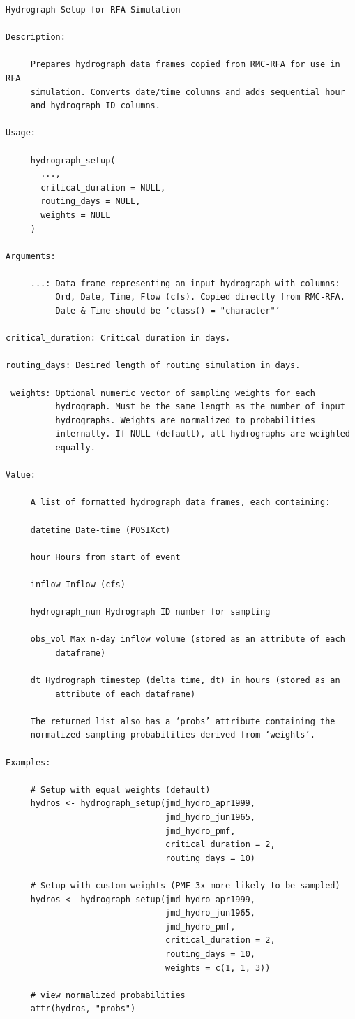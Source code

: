 \documentclass[
  letterpaper,
  DIV=11,
  numbers=noendperiod]{scrreprt}
\begin{document}
\begin{verbatim}
Hydrograph Setup for RFA Simulation

Description:

     Prepares hydrograph data frames copied from RMC-RFA for use in RFA
     simulation. Converts date/time columns and adds sequential hour
     and hydrograph ID columns.

Usage:

     hydrograph_setup(
       ...,
       critical_duration = NULL,
       routing_days = NULL,
       weights = NULL
     )
     
Arguments:

     ...: Data frame representing an input hydrograph with columns:
          Ord, Date, Time, Flow (cfs). Copied directly from RMC-RFA.
          Date & Time should be ‘class() = "character"’

critical_duration: Critical duration in days.

routing_days: Desired length of routing simulation in days.

 weights: Optional numeric vector of sampling weights for each
          hydrograph. Must be the same length as the number of input
          hydrographs. Weights are normalized to probabilities
          internally. If NULL (default), all hydrographs are weighted
          equally.

Value:

     A list of formatted hydrograph data frames, each containing:

     datetime Date-time (POSIXct)

     hour Hours from start of event

     inflow Inflow (cfs)

     hydrograph_num Hydrograph ID number for sampling

     obs_vol Max n-day inflow volume (stored as an attribute of each
          dataframe)

     dt Hydrograph timestep (delta time, dt) in hours (stored as an
          attribute of each dataframe)

     The returned list also has a ‘probs’ attribute containing the
     normalized sampling probabilities derived from ‘weights’.

Examples:

     # Setup with equal weights (default)
     hydros <- hydrograph_setup(jmd_hydro_apr1999,
                                jmd_hydro_jun1965,
                                jmd_hydro_pmf,
                                critical_duration = 2,
                                routing_days = 10)
     
     # Setup with custom weights (PMF 3x more likely to be sampled)
     hydros <- hydrograph_setup(jmd_hydro_apr1999,
                                jmd_hydro_jun1965,
                                jmd_hydro_pmf,
                                critical_duration = 2,
                                routing_days = 10,
                                weights = c(1, 1, 3))
     
     # view normalized probabilities
     attr(hydros, "probs")
     
\end{verbatim}
\end{document}
